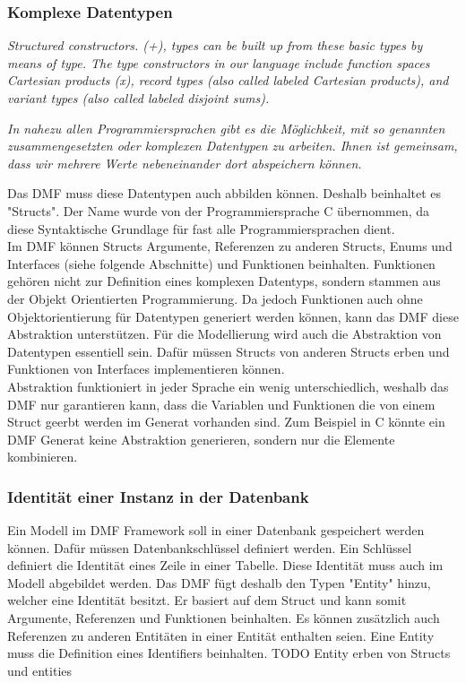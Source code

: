 \documentclass[./einleitung.tex]{subfiles}
\begin{document}
\subsubsection{Komplexe Datentypen}
\begin{center}
 \textit{Structured constructors. (+), types can be built up from these basic types by means of type. The type constructors in 
our language include function spaces Cartesian products (x), record types (also called labeled  Cartesian products), and variant types (also called labeled disjoint sums).\cite{https://dl.acm.org/doi/pdf/10.1145/6041.6042}}
 \end{center}
 
 \begin{center}
 \textit{
In nahezu allen Programmiersprachen gibt es die Möglichkeit, mit so genannten zusammengesetzten oder komplexen Datentypen zu arbeiten. Ihnen ist gemeinsam, dass wir mehrere Werte nebeneinander dort abspeichern können.\cite{978-3-8348-9999-6.pdf}}
\end{center}
Das DMF muss diese Datentypen auch abbilden können. Deshalb beinhaltet es "Structs". Der Name wurde von der Programmiersprache C übernommen, da diese Syntaktische Grundlage für fast alle Programmiersprachen dient. \\
Im DMF können Structs Argumente, Referenzen zu anderen Structs, Enums und Interfaces (siehe folgende Abschnitte) und Funktionen beinhalten.
Funktionen gehören nicht zur Definition eines komplexen Datentyps, sondern stammen aus der Objekt Orientierten Programmierung. Da jedoch Funktionen auch ohne Objektorientierung für Datentypen generiert werden können, kann das DMF diese Abstraktion unterstützen.
\newline
Für die Modellierung wird auch die Abstraktion von Datentypen essentiell sein. Dafür müssen Structs von anderen Structs erben und Funktionen von Interfaces implementieren können. \\
Abstraktion funktioniert in jeder Sprache ein wenig unterschiedlich, weshalb das DMF nur garantieren kann, dass die Variablen und Funktionen die von einem Struct geerbt werden im Generat vorhanden sind. Zum Beispiel in C könnte ein DMF Generat keine Abstraktion generieren, sondern nur die Elemente kombinieren.



\subsubsection{Identität einer Instanz in der Datenbank}
Ein Modell im DMF Framework soll in einer Datenbank gespeichert werden können.
Dafür müssen Datenbankschlüssel definiert werden. Ein Schlüssel definiert die Identität eines Zeile in einer Tabelle.
Diese Identität muss auch im Modell abgebildet werden.
Das DMF fügt deshalb den Typen "Entity" hinzu, welcher eine Identität besitzt. Er basiert auf dem Struct und kann somit Argumente, Referenzen und Funktionen beinhalten. Es können zusätzlich auch Referenzen zu anderen Entitäten in einer Entität enthalten seien.
Eine Entity muss die Definition eines Identifiers beinhalten.
TODO Entity erben von Structs und entities
\end{document}
